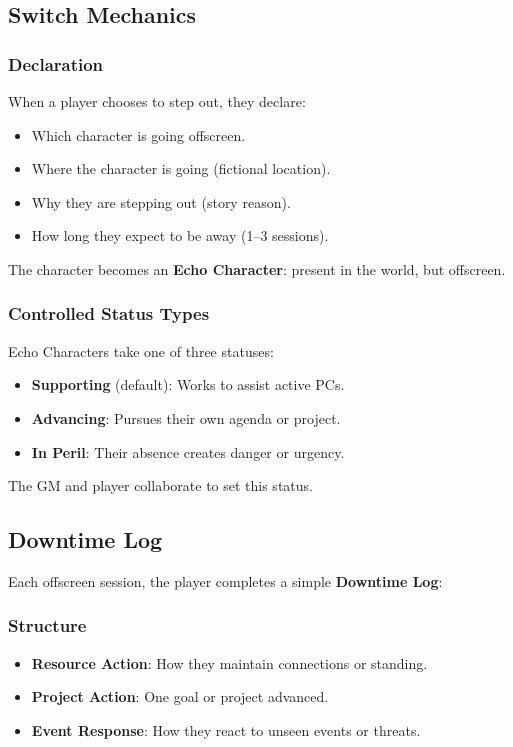 \subsection{Switch Mechanics}
\label{sec:mcs-switch}

\subsubsection{Declaration}
When a player chooses to step out, they declare:
\begin{itemize}
    \item Which character is going offscreen.
    \item Where the character is going (fictional location).
    \item Why they are stepping out (story reason).
    \item How long they expect to be away (1–3 sessions).
\end{itemize}
The character becomes an \textbf{Echo Character}: present in the world, but offscreen.

\subsubsection{Controlled Status Types}
Echo Characters take one of three statuses:
\begin{itemize}
    \item \textbf{Supporting} (default): Works to assist active PCs.
    \item \textbf{Advancing}: Pursues their own agenda or project.
    \item \textbf{In Peril}: Their absence creates danger or urgency.
\end{itemize}
The GM and player collaborate to set this status.

\subsection{Downtime Log}
\label{sec:mcs-downtime-log}
Each offscreen session, the player completes a simple \textbf{Downtime Log}:

\subsubsection{Structure}
\begin{itemize}
    \item \textbf{Resource Action}: How they maintain connections or standing.
    \item \textbf{Project Action}: One goal or project advanced.
    \item \textbf{Event Response}: How they react to unseen events or threats.
\end{itemize}

